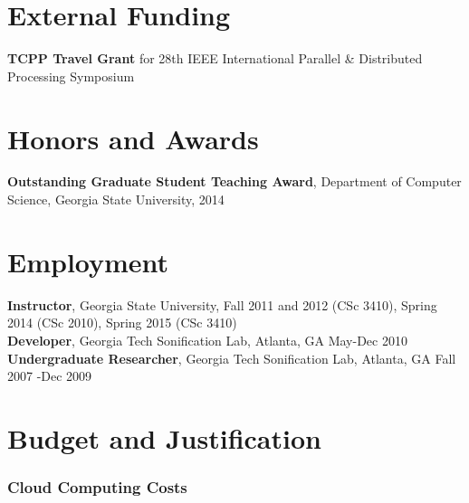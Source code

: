 \documentclass[12pt,a4paper]{article}
\begin{document}
\section*{External Funding}
\textbf{TCPP Travel Grant} for 28th IEEE International Parallel \& Distributed Processing Symposium

\section*{Honors and Awards}
\textbf{Outstanding Graduate Student Teaching Award}, Department of Computer Science, Georgia State University, 2014

\section*{Employment}
{\bf Instructor}, Georgia State University, Fall 2011 and 2012 (CSc 3410), Spring 2014 (CSc 2010), Spring 2015 (CSc 3410)\\
{\bf Developer}, Georgia Tech Sonification Lab, Atlanta, GA May-Dec 2010\\
{\bf Undergraduate Researcher}, Georgia Tech Sonification Lab, Atlanta, GA Fall 2007 -Dec 2009


\newpage 
\section{Budget and Justification}

\begin{table}[h!]


\end{table}

\subsubsection*{Cloud Computing Costs}
\end{document}
